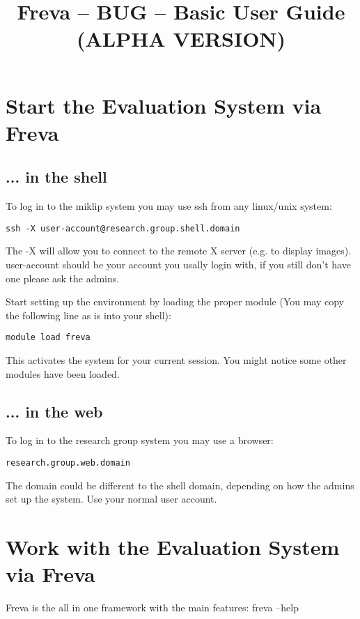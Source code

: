 \documentclass[a4paper,11pt]{ltxdoc}
\title{Freva -- BUG -- Basic User Guide (ALPHA VERSION)}
\begin{document}
\maketitle

\section{Start the Evaluation System via Freva}

\subsection*{... in the shell}
To log in to the miklip system you may use ssh from any linux/unix system:
\begin{lstlisting} 
ssh -X user-account@research.group.shell.domain
\end{lstlisting}

The -X will allow you to connect to the remote X server (e.g. to display images). user-account should be your account you usally login with, if you still don't have one please ask the admins.

Start setting up the environment by loading the proper module (You may copy the following line as is into your shell):
\begin{lstlisting}
module load freva
\end{lstlisting}

This activates the system for your current session. You might notice some other modules have been loaded.

\subsection*{... in the web}

To log in to the research group system you may use a browser:
\begin{lstlisting} 
research.group.web.domain
\end{lstlisting}

The domain could be different to the shell domain, depending on how the admins set up the system. Use your normal user account.

\section{Work with the Evaluation System via Freva}

Freva is the all in one framework with the main features: freva --help
\end{document}
